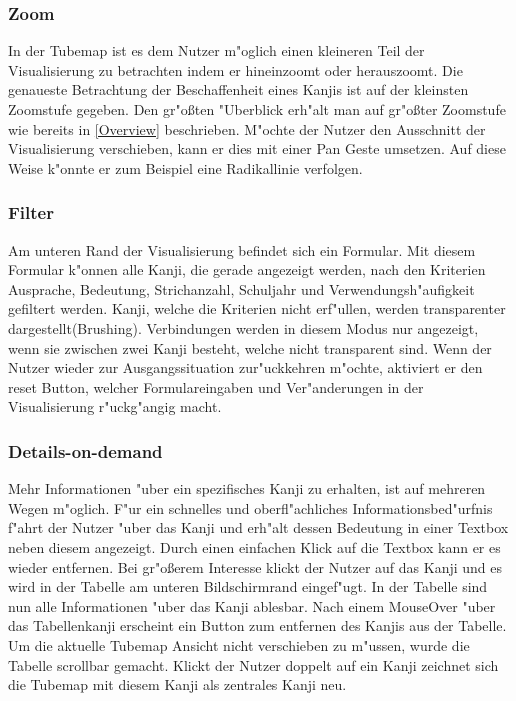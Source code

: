 \subsubsection{Zoom}
In der Tubemap ist es dem Nutzer m"oglich einen kleineren Teil der Visualisierung zu betrachten indem er hineinzoomt oder herauszoomt. Die genaueste Betrachtung der Beschaffenheit eines Kanjis ist auf der kleinsten Zoomstufe gegeben. Den gr"oßten "Uberblick erh"alt man auf gr"oßter Zoomstufe wie bereits in \ref{Overview} beschrieben. M"ochte der Nutzer den Ausschnitt der Visualisierung verschieben, kann er dies mit einer Pan Geste umsetzen. Auf diese Weise k"onnte er zum Beispiel eine Radikallinie verfolgen.

\subsubsection{Filter}
Am unteren Rand der Visualisierung befindet sich ein Formular. Mit diesem Formular k"onnen alle Kanji, die gerade angezeigt werden, nach den Kriterien Ausprache, Bedeutung, Strichanzahl, Schuljahr und Verwendungsh"aufigkeit gefiltert werden. Kanji, welche die Kriterien nicht erf"ullen, werden transparenter dargestellt(Brushing). Verbindungen werden in diesem Modus nur angezeigt, wenn sie zwischen zwei Kanji besteht, welche nicht transparent sind. Wenn der Nutzer wieder zur Ausgangssituation zur"uckkehren m"ochte, aktiviert er den reset Button, welcher Formulareingaben und Ver"anderungen in der Visualisierung r"uckg"angig macht.

\subsubsection{Details-on-demand}
Mehr Informationen "uber ein spezifisches Kanji zu erhalten, ist auf mehreren Wegen m"oglich. F"ur ein schnelles und oberfl"achliches Informationsbed"urfnis f"ahrt der Nutzer "uber das Kanji und erh"alt dessen Bedeutung in einer Textbox neben diesem angezeigt. Durch einen einfachen Klick auf die Textbox kann er es wieder entfernen. Bei gr"oßerem Interesse klickt der Nutzer auf das Kanji und es wird in der Tabelle am unteren Bildschirmrand eingef"ugt. In der Tabelle sind nun alle Informationen "uber das Kanji ablesbar. Nach einem MouseOver "uber das Tabellenkanji erscheint ein Button zum entfernen des Kanjis aus der Tabelle. Um die aktuelle Tubemap Ansicht nicht verschieben zu m"ussen, wurde die Tabelle scrollbar gemacht. Klickt der Nutzer doppelt auf ein Kanji zeichnet sich die Tubemap mit diesem Kanji als zentrales Kanji neu. 


